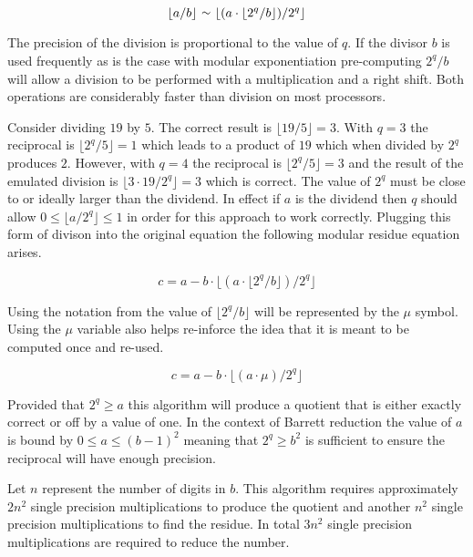 \documentclass[b5paper]{book}
\def\approx{\raisebox{0.2ex}{\mbox{\small $\sim$}}}
\begin{document}
\begin{equation}
\lfloor a / b \rfloor \mbox{ }\approx\mbox{ } \lfloor (a \cdot \lfloor 2^q / b \rfloor)/2^q \rfloor
\end{equation}

The precision of the division is proportional to the value of $q$.  If the divisor $b$ is used frequently as is the case with 
modular exponentiation pre-computing $2^q/b$ will allow a division to be performed with a multiplication and a right shift.  Both operations
are considerably faster than division on most processors.  

Consider dividing $19$ by $5$.  The correct result is $\lfloor 19/5 \rfloor = 3$.  With $q = 3$ the reciprocal is $\lfloor 2^q/5 \rfloor = 1$ which
leads to a product of $19$ which when divided by $2^q$ produces $2$.  However, with $q = 4$ the reciprocal is $\lfloor 2^q/5 \rfloor = 3$ and
the result of the emulated division is $\lfloor 3 \cdot 19 / 2^q \rfloor = 3$ which is correct.  The value of $2^q$ must be close to or ideally
larger than the dividend.  In effect if $a$ is the dividend then $q$ should allow $0 \le \lfloor a/2^q \rfloor \le 1$ in order for this approach
to work correctly.  Plugging this form of divison into the original equation the following modular residue equation arises.

\begin{equation}
c = a - b \cdot \lfloor (a \cdot \lfloor 2^q / b \rfloor)/2^q \rfloor
\end{equation}

Using the notation from \cite{BARRETT} the value of $\lfloor 2^q / b \rfloor$ will be represented by the $\mu$ symbol.  Using the $\mu$
variable also helps re-inforce the idea that it is meant to be computed once and re-used.

\begin{equation}
c = a - b \cdot \lfloor (a \cdot \mu)/2^q \rfloor
\end{equation}

Provided that $2^q \ge a$ this algorithm will produce a quotient that is either exactly correct or off by a value of one.  In the context of Barrett
reduction the value of $a$ is bound by $0 \le a \le (b - 1)^2$ meaning that $2^q \ge b^2$ is sufficient to ensure the reciprocal will have enough
precision.  

Let $n$ represent the number of digits in $b$.  This algorithm requires approximately $2n^2$ single precision multiplications to produce the quotient and 
another $n^2$ single precision multiplications to find the residue.  In total $3n^2$ single precision multiplications are required to 
reduce the number.  
\end{document}
